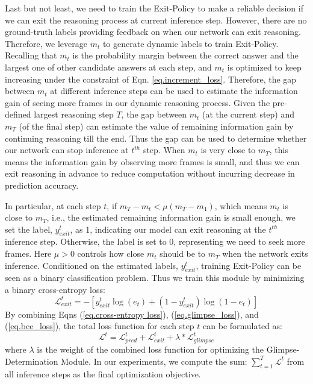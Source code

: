 \documentclass[final]{cvpr}
\begin{document}
Last but not least, we need to train the Exit-Policy to make a reliable decision if we can exit the reasoning process at current inference step. However, there are no ground-truth labels providing feedback on when our network can exit reasoning.
Therefore, we leverage $m_t$ 
to generate dynamic labels to train Exit-Policy. Recalling that $m_{t}$ is the probability margin between the correct answer and the largest one of other candidate answers at each step, and $m_{t}$ is optimized to keep increasing 
under the constraint of Eqn. \ref{eq.increment_loss}. 
Therefore, the gap between $m_t$ at different inference steps can be used to estimate the information gain of seeing more frames in our dynamic reasoning process. Given the pre-defined largest reasoning step $T$, the gap between $m_t$ (at the current step) and $m_T$ (of the final step) can estimate the value of remaining information gain by continuing reasoning till the end. Thus the gap can be used to determine whether our network can stop inference at $t^{th}$ step. When $m_t$ is very close to $m_T$, this means the information gain by observing more frames is small, and thus we can exit reasoning in advance to reduce computation without incurring decrease in prediction accuracy.


In particular, at each step $t$, if $m_{T} - m_{t}<\mu(m_{T}-m_1)$, which means $m_t$ is close to $m_T$, i.e., the estimated remaining information gain is small enough, we set the label, $y^t_{exit}$, as 1, indicating our model can exit reasoning at the $t^{th}$ inference step. Otherwise, the label is set to 0, representing we need to seek more frames. Here $\mu>0$ controls how close $m_t$ should be to $m_T$ when the network exits inference. Conditioned on the estimated labels, $y^t_{exit}$, training Exit-Policy can be seen as a binary classification problem. Thus we train this module by minimizing a binary cross-entropy loss:
\begin{equation}\label{eq.bce_loss}
    \mathcal{L}^t_{exit}= -[y^t_{exit}\log(e_{t}) + (1-y^t_{exit})\log(1-e_{t})]
\end{equation}
By combining Eqns (\ref{eq.cross-entropy loss}), (\ref{eq.glimpse_loss}),
and (\ref{eq.bce_loss}), the total loss function for each step $t$ can be formulated as:
\begin{equation}\label{eq.final_loss}
    \mathcal{L}^t = \mathcal{L}^t_{pred} + \mathcal{L}^t_{exit} + \lambda *\mathcal{L}^t_{glimpse}
\end{equation}
where $\lambda$ is the weight of the combined loss function for optimizing the Glimpse-Determination Module.
In our experiments, we compute the sum: $\sum_{t=1}^{T}{\mathcal{L}^t}$ from all inference steps as the final optimization objective. 
\end{document}
